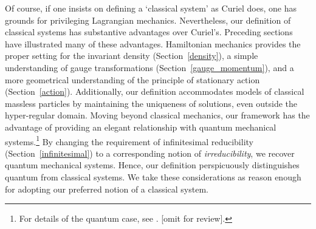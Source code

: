 \documentclass[letterpaper]{article}
\begin{document}


Of course, if one insists on defining a `classical system' as Curiel does, one has grounds for privileging Lagrangian mechanics. Nevertheless, our definition of classical systems has substantive advantages over Curiel's. Preceding sections have illustrated many of these advantages. Hamiltonian mechanics provides the proper setting for the invariant density (Section~\ref{density}), a simple understanding of gauge transformations (Section~\ref{gauge_momentum}), and a more geometrical understanding of the principle of stationary action (Section~\ref{action}). Additionally, our definition accommodates models of classical massless particles by maintaining the uniqueness of solutions, even outside the hyper-regular domain. Moving beyond classical mechanics, our framework has the advantage of providing an elegant relationship with quantum mechanical systems.\footnote{For details of the quantum case, see \textcites{AoPPhy1}. [omit for review].} By changing the requirement of infinitesimal reducibility (Section~\ref{infinitesimal}) to a corresponding notion of \textit{irreducibility}, we recover quantum mechanical systems. Hence, our definition perspicuously distinguishes quantum from classical systems. We take these considerations as reason enough for adopting our preferred notion of a classical system. 
\end{document}
